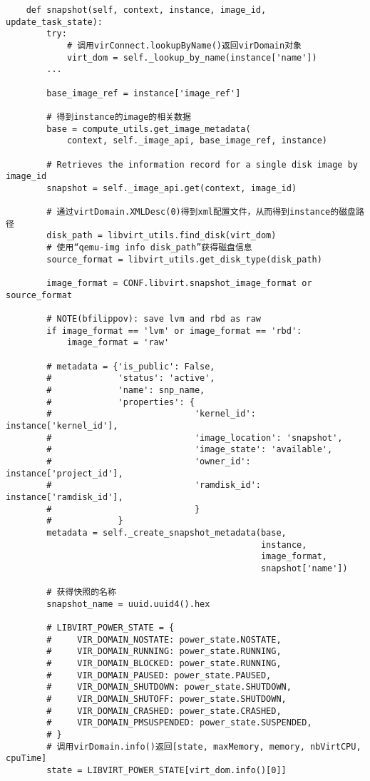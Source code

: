 \documentclass[a4paper,left=1.5cm,right=1.5cm,11pt]{article}
\begin{document}
    \begin{lstlisting}
    def snapshot(self, context, instance, image_id, update_task_state):
        try:
            # 调用virConnect.lookupByName()返回virDomain对象
            virt_dom = self._lookup_by_name(instance['name'])
        ...

        base_image_ref = instance['image_ref']

        # 得到instance的image的相关数据
        base = compute_utils.get_image_metadata(
            context, self._image_api, base_image_ref, instance)
        
        # Retrieves the information record for a single disk image by image_id
        snapshot = self._image_api.get(context, image_id)

        # 通过virtDomain.XMLDesc(0)得到xml配置文件，从而得到instance的磁盘路径
        disk_path = libvirt_utils.find_disk(virt_dom)
        # 使用“qemu-img info disk_path”获得磁盘信息
        source_format = libvirt_utils.get_disk_type(disk_path)

        image_format = CONF.libvirt.snapshot_image_format or source_format

        # NOTE(bfilippov): save lvm and rbd as raw
        if image_format == 'lvm' or image_format == 'rbd':
            image_format = 'raw'
        
        # metadata = {'is_public': False,
        #             'status': 'active',
        #             'name': snp_name,
        #             'properties': {
        #                            'kernel_id': instance['kernel_id'],
        #                            'image_location': 'snapshot',
        #                            'image_state': 'available',
        #                            'owner_id': instance['project_id'],
        #                            'ramdisk_id': instance['ramdisk_id'],
        #                            }
        #             }
        metadata = self._create_snapshot_metadata(base,
                                                  instance,
                                                  image_format,
                                                  snapshot['name'])
        
        # 获得快照的名称
        snapshot_name = uuid.uuid4().hex

        # LIBVIRT_POWER_STATE = {
        #     VIR_DOMAIN_NOSTATE: power_state.NOSTATE,
        #     VIR_DOMAIN_RUNNING: power_state.RUNNING,
        #     VIR_DOMAIN_BLOCKED: power_state.RUNNING,
        #     VIR_DOMAIN_PAUSED: power_state.PAUSED,
        #     VIR_DOMAIN_SHUTDOWN: power_state.SHUTDOWN,
        #     VIR_DOMAIN_SHUTOFF: power_state.SHUTDOWN,
        #     VIR_DOMAIN_CRASHED: power_state.CRASHED,
        #     VIR_DOMAIN_PMSUSPENDED: power_state.SUSPENDED,
        # }
        # 调用virDomain.info()返回[state, maxMemory, memory, nbVirtCPU, cpuTime]
        state = LIBVIRT_POWER_STATE[virt_dom.info()[0]]


\end{lstlisting}
\end{document}
